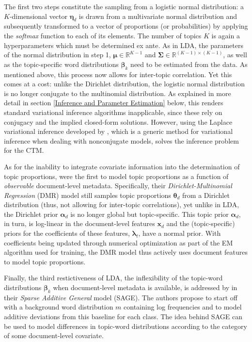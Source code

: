 \noindent
The first two steps constitute the sampling from a logistic normal distribution: a $K$-dimensional vector $\boldsymbol{\eta}_d$ is drawn from a multivariate normal distribution and subsequently transformed to a vector of proportions (or probabilities) by applying the \textit{softmax} function to each of its elements. The number of topics $K$ is again a hyperparameters which must be determined ex ante. As in LDA, the parameters of the normal distribution in step 1, $\boldsymbol{\mu} \in \mathbb{R}^{K-1}$ and $\boldsymbol{\Sigma} \in \mathbb{R}^{(K-1) \times (K-1)}$, as well as the topic-specific word distributions $\boldsymbol{\beta}_k$ need to be estimated from the data. As mentioned above, this process now allows for inter-topic correlation. Yet this comes at a cost: unlike the Dirichlet distribution, the logistic normal distribution is no longer conjugate to the multinomial distribution. As explained in more detail in section \ref{Inference and Parameter Estimation} below, this renders standard variational inference algorithms inapplicable, since these rely on conjugacy and the implied closed-form solutions. However, using the Laplace variational inference developed by \cite{wang2013variational}, which is a generic method for variational inference when dealing with nonconjugate models, solves the inference problem for the CTM.

As for the inability to integrate covariate information into the determination of topic proportions, \cite{mimno2011optimizing} were the first to model topic proportions as a function of \textit{observable} document-level metadata. Specifically, their \textit{Dirichlet-Multinomial Regression} (DMR) model still samples topic proportions $\boldsymbol{\theta}_d$ from a Dirichlet distribution (thus, not allowing for inter-topic correlations), yet unlike in LDA, the Dirichlet prior $\boldsymbol{\alpha}_d$ is no longer global but topic-specific. This topic prior $\boldsymbol{\alpha}_d$, in turn, is log-linear in the document-level features $\boldsymbol{x}_d$ and the (topic-specific) priors for the coefficients of these features, $\boldsymbol{\lambda}_t$, have a normal prior. With coefficients being updated through numerical optimization as part of the EM algorithm used for training, the DMR model thus actively uses document features to model topic proportions. 

Finally, the third restictiveness of LDA, the inflexibility of the topic-word distributions $\boldsymbol{\beta}_k$ when document-level metadata is available, is addressed by \cite{eisenstein2011sparse} in their \textit{Sparse Additive General} model (SAGE). The authors propose to start off with a background word distribution $m$ containing log frequencies and to model additive deviations from this baseline for each class. The idea behind SAGE can be used to model differences in topic-word distributions according to the category of some document-level covariate.

